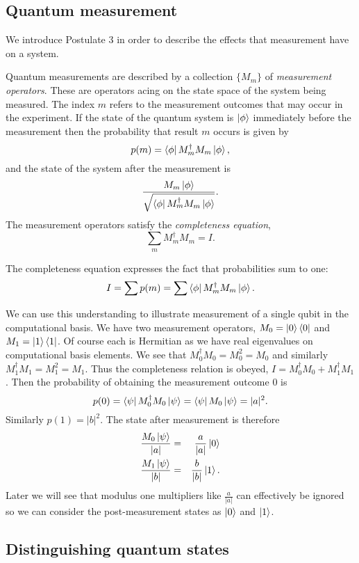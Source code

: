 \documentclass{article}
\begin{document}
\subsection{Quantum measurement}

We introduce Postulate 3 in order to describe the effects that measurement have on a system.

\begin{postulate}
  Quantum measurements are described by a collection $\{M_m\}$ of \textit{measurement operators}. These are operators acing on the state space of the system being measured. The index $m$ refers to the measurement outcomes that may occur in the experiment. If the state of the quantum system is $\ket\phi$ immediately before the measurement then the probability that result $m$ occurs is given by
  \[p(m)=\bra{\phi}M_m^\dagger M_m\ket{\phi},\]
  and the state of the system after the measurement is
  \[\frac{M_m\ket{\phi}}{\sqrt{\bra\phi M_m^\dagger M_m\ket\phi}}.\]
  The measurement operators satisfy the \textit{completeness equation},
  \[\sum_m M_m^\dagger M_m = I.\]
\end{postulate}

The completeness equation expresses the fact that probabilities sum to one:
\[I=\sum p(m)=\sum \bra\phi M^\dagger_m M_m\ket\phi.\]


We can use this understanding to illustrate measurement of a single qubit in the computational basis. We have two measurement operators, $M_0=\ket{0}\bra{0}$ and $M_1=\ket{1}\bra{1}$. Of course each is Hermitian as we have real eigenvalues on computational basis elements. We see that $M_0^\dagger M_0=M_0^2=M_0$ and similarly $M_1^\dagger M_1=M_1^2=M_1$. Thus the completeness relation is obeyed, $I=M_0^\dagger M_0+M_1^\dagger M_1$. Then the probability of obtaining the measurement outcome $0$ is
\[
  p(0)=\bra{\psi}M_0^\dagger M_0\ket{\psi}
  =\bra{\psi}M_0\ket{\psi}=|a|^2.
\]
Similarly $p(1)=|b|^2$. The state after measurement is therefore
\begin{eqnarray*}
  \frac{M_0\ket\psi}{|a|}&=&\frac{a}{|a|}\ket0\\
  \frac{M_1\ket\psi}{|b|}&=&\frac{b}{|b|}\ket1.\\
\end{eqnarray*}
Later we will see that modulus one multipliers like $\frac{a}{|a|}$ can effectively be ignored so we can consider the post-measurement states as $\ket0$ and $\ket1$.

\subsection{Distinguishing quantum states}
\end{document}
